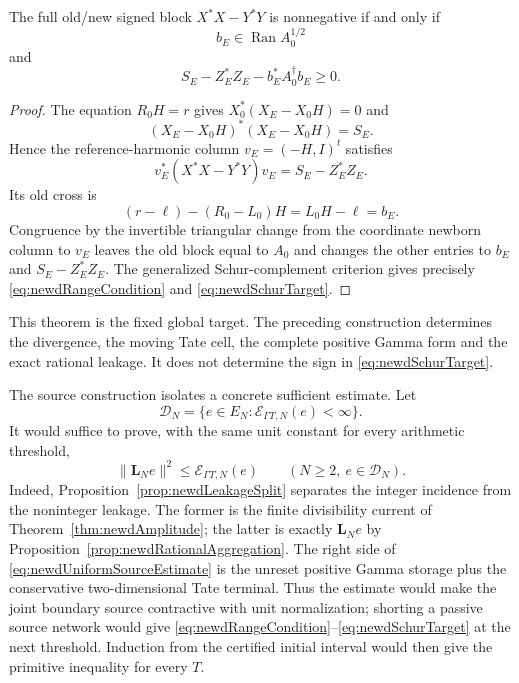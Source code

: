 \begin{theorem}
\label{thm:newdThresholdCriterion}
The full old/new signed block $X^*X-Y^*Y$ is nonnegative if and only if
\begin{equation}\label{eq:newdRangeCondition}
 b_E\in\operatorname{Ran}A_0^{1/2}
\end{equation}
and
\begin{equation}\label{eq:newdSchurTarget}
 S_E-Z_E^*Z_E-b_E^*A_0^\dagger b_E\geq0.
\end{equation}
\end{theorem}

\begin{proof}
The equation $R_0H=r$ gives
$X_0^*(X_E-X_0H)=0$ and
\[
 (X_E-X_0H)^*(X_E-X_0H)=S_E.
\]
Hence the reference-harmonic column $v_E=(-H,I)^t$ satisfies
\[
 v_E^*(X^*X-Y^*Y)v_E=S_E-Z_E^*Z_E.
\]
Its old cross is
\[
 (r-\ell)-(R_0-L_0)H=L_0H-\ell=b_E.
\]
Congruence by the invertible triangular change from the coordinate newborn
column to $v_E$ leaves the old block equal to $A_0$ and changes the other
entries to $b_E$ and $S_E-Z_E^*Z_E$.  The generalized Schur-complement
criterion gives precisely \eqref{eq:newdRangeCondition} and
\eqref{eq:newdSchurTarget}.
\end{proof}

This theorem is the fixed global target.  The preceding construction
determines the divergence, the moving Tate cell, the complete positive Gamma
form and the exact rational leakage.  It does not determine the sign in
\eqref{eq:newdSchurTarget}.

The source construction isolates a concrete sufficient estimate.  Let
\[
 \mathscr D_N=
 \{e\in E_N:\mathcal E_{\Gamma T,N}(e)<\infty\}.
\]
It would suffice to prove, with the same unit constant for every arithmetic
threshold,
\begin{equation}\label{eq:newdUniformSourceEstimate}
 \|\mathbf L_Ne\|^2\leq\mathcal E_{\Gamma T,N}(e)
 \qquad(N\geq2,\ e\in\mathscr D_N).
\end{equation}
Indeed, Proposition~\ref{prop:newdLeakageSplit} separates the integer
incidence from the noninteger leakage.  The former is the finite
divisibility current of Theorem~\ref{thm:newdAmplitude}; the latter is
exactly $\mathbf L_Ne$ by
Proposition~\ref{prop:newdRationalAggregation}.  The right side of
\eqref{eq:newdUniformSourceEstimate} is the unreset positive Gamma storage
plus the conservative two-dimensional Tate terminal.  Thus the estimate
would make the joint boundary source contractive with unit normalization;
shorting a passive source network would give
\eqref{eq:newdRangeCondition}--\eqref{eq:newdSchurTarget} at the next
threshold.  Induction from the certified initial interval would then give
the primitive inequality for every $T$.


